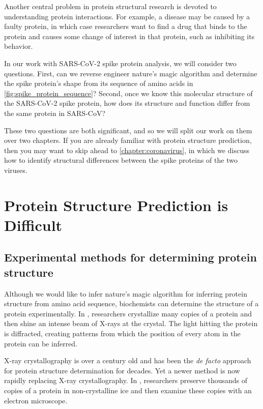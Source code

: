 Another central problem in protein structural research is devoted to understanding protein interactions. For example, a disease may be caused by a faulty protein, in which case researchers want to find a drug that binds to the protein and causes some change of interest in that protein, such as inhibiting its behavior.

In our work with SARS-CoV-2 spike protein analysis, we will consider two questions. First, can we reverse engineer nature's magic algorithm and determine the spike protein's shape from its sequence of amino acids in \autoref{fig:spike_protein_sequence}? Second, once we know this molecular structure of the SARS-CoV-2 spike protein, how does its structure and function differ from the same protein in SARS-CoV?

These two questions are both significant, and so we will split our work on them over two chapters. If you are already familiar with protein structure prediction, then you may want to skip ahead to \autoref{chapter:coronavirus}, in which we discuss how to identify structural differences between the spike proteins of the two viruses.\\

\FloatBarrier
{}

\section{Protein Structure Prediction is Difficult}
\label{sec:structure_intro}

\subsection{Experimental methods for determining protein structure}

Although we would like to infer nature's magic algorithm for inferring protein structure from amino acid sequence, biochemists can determine the structure of a protein experimentally. In , researchers crystallize many copies of a protein and then shine an intense beam of X-rays at the crystal. The light hitting the protein is diffracted, creating patterns from which the position of every atom in the protein can be inferred.

X-ray crystallography is over a century old and has been the \textit{de facto} approach for protein structure determination for decades. Yet a newer method is now rapidly replacing X-ray crystallography. In , researchers preserve thousands of copies of a protein in non-crystalline ice and then examine these copies with an electron microscope.

